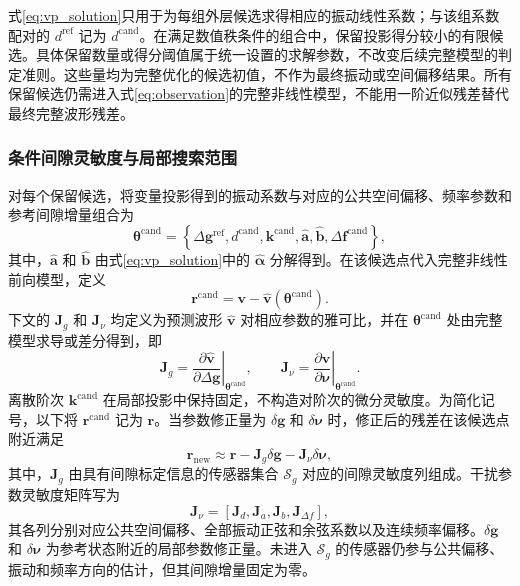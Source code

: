 \documentclass[UTF8,12pt,a4paper]{ctexart}
\begin{document}
式\eqref{eq:vp_solution}只用于为每组外层候选求得相应的振动线性系数；与该组系数配对的 $d^{\mathrm{ref}}$ 记为 $d^{\mathrm{cand}}$。在满足数值秩条件的组合中，保留投影得分较小的有限候选。具体保留数量或得分阈值属于统一设置的求解参数，不改变后续完整模型的判定准则。这些量均为完整优化的候选初值，不作为最终振动或空间偏移结果。所有保留候选仍需进入式\eqref{eq:observation}的完整非线性模型，不能用一阶近似残差替代最终完整波形残差。

\subsubsection{条件间隙灵敏度与局部搜索范围}

对每个保留候选，将变量投影得到的振动系数与对应的公共空间偏移、频率参数和参考间隙增量组合为
\begin{equation}
\bm\theta^{\mathrm{cand}}=
\left\{
\Delta\bm g^{\mathrm{ref}},
d^{\mathrm{cand}},
\bm k^{\mathrm{cand}},
\widehat{\bm a},
\widehat{\bm b},
\Delta\bm f^{\mathrm{cand}}
\right\},
\label{eq:candidate_point}
\end{equation}
其中，$\widehat{\bm a}$ 和 $\widehat{\bm b}$ 由式\eqref{eq:vp_solution}中的 $\widehat{\bm\alpha}$ 分解得到。在该候选点代入完整非线性前向模型，定义
\begin{equation}
\bm r^{\mathrm{cand}}
=\bm v-\widehat{\bm v}(\bm\theta^{\mathrm{cand}}).
\label{eq:candidate_residual}
\end{equation}
下文的 $\bm J_g$ 和 $\bm J_{\nu}$ 均定义为预测波形 $\widehat{\bm v}$ 对相应参数的雅可比，并在 $\bm\theta^{\mathrm{cand}}$ 处由完整模型求导或差分得到，即
\begin{equation}
\bm J_g=
\left.
\frac{\partial\widehat{\bm v}}
{\partial\Delta\bm g}
\right|_{\bm\theta^{\mathrm{cand}}},
\qquad
\bm J_{\nu}=
\left.
\frac{\partial\widehat{\bm v}}
{\partial\bm\nu}
\right|_{\bm\theta^{\mathrm{cand}}}.
\label{eq:prediction_jacobians}
\end{equation}
离散阶次 $\bm k^{\mathrm{cand}}$ 在局部投影中保持固定，不构造对阶次的微分灵敏度。为简化记号，以下将 $\bm r^{\mathrm{cand}}$ 记为 $\bm r$。当参数修正量为 $\delta\bm g$ 和 $\delta\bm\nu$ 时，修正后的残差在该候选点附近满足
\begin{equation}
\bm r_{\mathrm{new}}
\approx
\bm r-
\bm J_g\delta\bm g-
\bm J_{\nu}\delta\bm\nu,
\label{eq:local_model}
\end{equation}
其中，$\bm J_g$ 由具有间隙标定信息的传感器集合 $\mathcal S_g$ 对应的间隙灵敏度列组成。干扰参数灵敏度矩阵写为
\begin{equation}
\bm J_{\nu}=
[\bm J_d,\bm J_{a},\bm J_b,\bm J_{\Delta f}],
\label{eq:nuisance_jacobian}
\end{equation}
其各列分别对应公共空间偏移、全部振动正弦和余弦系数以及连续频率偏移。$\delta\bm g$ 和 $\delta\bm\nu$ 为参考状态附近的局部参数修正量。未进入 $\mathcal S_g$ 的传感器仍参与公共偏移、振动和频率方向的估计，但其间隙增量固定为零。
\end{document}
